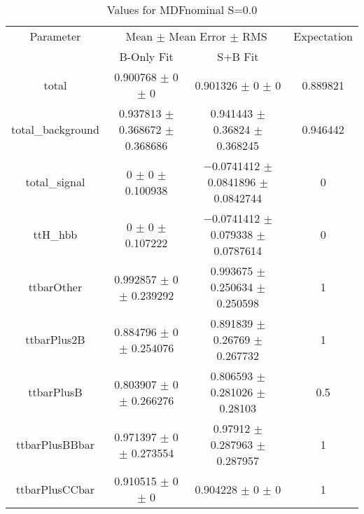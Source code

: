 \begin{table}
\centering
\caption{Values for MDFnominal S=0.0}
\begin{tabular}{cccc}
\toprule
Parameter & \multicolumn{2}{c}{Mean $\pm$ Mean Error $\pm$ RMS} & Expectation\\
 & B-Only Fit & S+B Fit & \\
\midrule
total & \num{0.900768} $\pm$ \num{0} $\pm$ \num{0} & \num{0.901326} $\pm$ \num{0} $\pm$ \num{0} & \num{0.889821}\\
total\_background & \num{0.937813} $\pm$ \num{0.368672} $\pm$ \num{0.368686} & \num{0.941443} $\pm$ \num{0.36824} $\pm$ \num{0.368245} & \num{0.946442}\\
total\_signal & \num{0} $\pm$ \num{0} $\pm$ \num{0.100938} & \num{-0.0741412} $\pm$ \num{0.0841896} $\pm$ \num{0.0842744} & \num{0}\\
ttH\_hbb & \num{0} $\pm$ \num{0} $\pm$ \num{0.107222} & \num{-0.0741412} $\pm$ \num{0.079338} $\pm$ \num{0.0787614} & \num{0}\\
ttbarOther & \num{0.992857} $\pm$ \num{0} $\pm$ \num{0.239292} & \num{0.993675} $\pm$ \num{0.250634} $\pm$ \num{0.250598} & \num{1}\\
ttbarPlus2B & \num{0.884796} $\pm$ \num{0} $\pm$ \num{0.254076} & \num{0.891839} $\pm$ \num{0.26769} $\pm$ \num{0.267732} & \num{1}\\
ttbarPlusB & \num{0.803907} $\pm$ \num{0} $\pm$ \num{0.266276} & \num{0.806593} $\pm$ \num{0.281026} $\pm$ \num{0.28103} & \num{0.5}\\
ttbarPlusBBbar & \num{0.971397} $\pm$ \num{0} $\pm$ \num{0.273554} & \num{0.97912} $\pm$ \num{0.287963} $\pm$ \num{0.287957} & \num{1}\\
ttbarPlusCCbar & \num{0.910515} $\pm$ \num{0} $\pm$ \num{0} & \num{0.904228} $\pm$ \num{0} $\pm$ \num{0} & \num{1}\\
\bottomrule
\end{tabular}
\end{table}